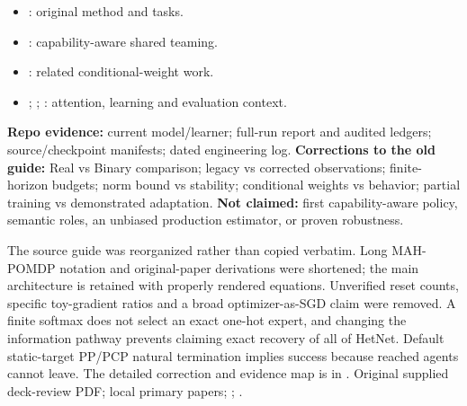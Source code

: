 {\small
\begin{itemize}
\item {}: original method and tasks.
\item {}: capability-aware shared teaming.
\item {}: related conditional-weight work.
\item {}; ; : attention, learning and evaluation context.
\end{itemize}
\medskip
\textbf{Repo evidence:} current model/learner; full-run report and audited ledgers; source/checkpoint manifests; dated engineering log.
\medskip
\textbf{Corrections to the old guide:} Real vs Binary comparison; legacy vs corrected observations; finite-horizon budgets; norm bound vs stability; conditional weights vs behavior; partial training vs demonstrated adaptation.
\medskip
\textbf{Not claimed:} first capability-aware policy, semantic roles, an unbiased production estimator, or proven robustness.}
{The source guide was reorganized rather than copied verbatim. Long MAH-POMDP notation and original-paper derivations were shortened; the main architecture is retained with properly rendered equations. Unverified reset counts, specific toy-gradient ratios and a broad optimizer-as-SGD claim were removed. A finite softmax does not select an exact one-hot expert, and changing the information pathway prevents claiming exact recovery of all of HetNet. Default static-target PP/PCP natural termination implies success because reached agents cannot leave. The detailed correction and evidence map is in .}
{Original supplied deck-review PDF; local primary papers; ; .}
